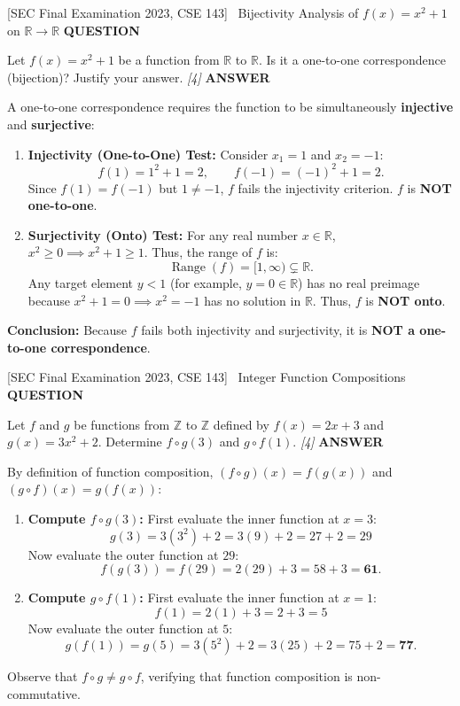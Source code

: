 \documentclass[11pt,a4paper]{article}
\newcommand{\Qlabel}{\textbf{\color{navy}\footnotesize\MakeUppercase{Question}}\par\smallskip}
\newcommand{\Alabel}{\textbf{\color{teal}\footnotesize\MakeUppercase{Answer}}\par\smallskip}
\begin{document}
\begin{exambox}{[SEC Final Examination 2023, CSE 143] \ Bijectivity Analysis of $f(x) = x^2+1$ on $\mathbb{R}\to\mathbb{R}$}
\Qlabel
Let $f(x) = x^2 + 1$ be a function from $\mathbb{R}$ to $\mathbb{R}$. Is it a one-to-one correspondence (bijection)? Justify your answer. \hfill\textit{[4]}
\tcblower
\Alabel
A one-to-one correspondence requires the function to be simultaneously \textbf{injective} and \textbf{surjective}:
\begin{enumerate}
    \item \textbf{Injectivity (One-to-One) Test:}
    Consider $x_1 = 1$ and $x_2 = -1$:
    \[
    f(1) = 1^2 + 1 = 2, \qquad f(-1) = (-1)^2 + 1 = 2.
    \]
    Since $f(1) = f(-1)$ but $1 \neq -1$, $f$ fails the injectivity criterion. $f$ is \textbf{NOT one-to-one}.
    
    \item \textbf{Surjectivity (Onto) Test:}
    For any real number $x \in \mathbb{R}$, $x^2 \ge 0 \implies x^2 + 1 \ge 1$.
    Thus, the range of $f$ is:
    \[
    \operatorname{Range}(f) = [1, \infty) \subsetneq \mathbb{R}.
    \]
    Any target element $y < 1$ (for example, $y = 0 \in \mathbb{R}$) has no real preimage because $x^2 + 1 = 0 \implies x^2 = -1$ has no solution in $\mathbb{R}$. Thus, $f$ is \textbf{NOT onto}.
\end{enumerate}
\textbf{Conclusion:} Because $f$ fails both injectivity and surjectivity, it is \textbf{NOT a one-to-one correspondence}.
\end{exambox}

\begin{exambox}{[SEC Final Examination 2023, CSE 143] \ Integer Function Compositions}
\Qlabel
Let $f$ and $g$ be functions from $\mathbb{Z}$ to $\mathbb{Z}$ defined by $f(x) = 2x + 3$ and $g(x) = 3x^2 + 2$. Determine $f \circ g(3)$ and $g \circ f(1)$. \hfill\textit{[4]}
\tcblower
\Alabel
By definition of function composition, $(f \circ g)(x) = f(g(x))$ and $(g \circ f)(x) = g(f(x))$:
\begin{enumerate}
    \item \textbf{Compute $f \circ g(3)$:}
    First evaluate the inner function at $x = 3$:
    \[
    g(3) = 3(3^2) + 2 = 3(9) + 2 = 27 + 2 = 29
    \]
    Now evaluate the outer function at $29$:
    \[
    f(g(3)) = f(29) = 2(29) + 3 = 58 + 3 = \mathbf{61}.
    \]
    \item \textbf{Compute $g \circ f(1)$:}
    First evaluate the inner function at $x = 1$:
    \[
    f(1) = 2(1) + 3 = 2 + 3 = 5
    \]
    Now evaluate the outer function at $5$:
    \[
    g(f(1)) = g(5) = 3(5^2) + 2 = 3(25) + 2 = 75 + 2 = \mathbf{77}.
    \]
\end{enumerate}
Observe that $f \circ g \neq g \circ f$, verifying that function composition is non-commutative.
\end{exambox}
\end{document}
